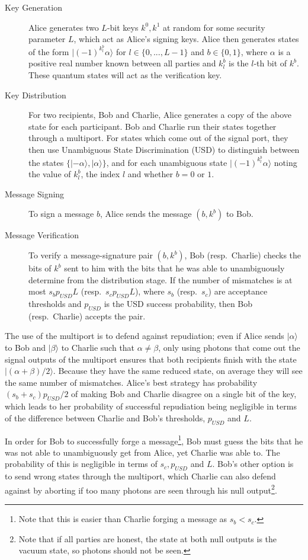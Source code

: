 \documentclass[%
 reprint,
 amsmath,amssymb,
 aps,
 pra,
]{revtex4-1}
\begin{document}
\begin{description}
\item[Key Generation]Alice generates two $L$-bit keys $k^0, k^1$ at random for some security parameter $L$, which act as Alice's signing keys. Alice then generates states of the form $|(-1)^{k^b_l}\alpha\rangle$ for $l \in \{0,...,L-1\}$ and $b \in \{0, 1\}$, where $\alpha$ is a positive real number known between all parties and $k^b_l$ is the $l$-th bit of $k^b$. These quantum states will act as the verification key.
\item[Key Distribution]For two recipients, Bob and Charlie, Alice generates a copy of the above state for each participant. Bob and Charlie run their states together through a multiport. For states which come out of the signal port, they then use Unambiguous State Discrimination (USD) \cite{Ivanovic1987257} to distinguish between the states $\{|-\alpha\rangle, |\alpha\rangle\}$, and for each unambiguous state $|(-1)^{k^b_l}\alpha\rangle$ noting the value of $k^b_l$, the index $l$ and whether $b = 0$ or $1$.
\item[Message Signing]To sign a message $b$, Alice sends the message $(b, k^b)$ to Bob.
\item[Message Verification]To verify a message-signature pair $(b, k^b)$, Bob (resp.\ Charlie) checks the bits of $k^b$ sent to him with the bits that he was able to unambiguously determine from the distribution stage. If the number of mismatches is at most $s_bp_{USD}L$ (resp.\ $s_cp_{USD}L$), where $s_b$ (resp.\ $s_c$) are acceptance thresholds and $p_{USD}$ is the USD success probability, then Bob (resp.\ Charlie) accepts the pair.
\end{description}

The use of the multiport is to defend against repudiation; even if Alice sends $|\alpha\rangle$ to Bob and $|\beta\rangle$ to Charlie such that $\alpha \neq \beta$, only using photons that come out the signal outputs of the multiport ensures that both recipients finish with the state $|(\alpha + \beta)/2\rangle$. Because they have the same reduced state, on average they will see the same number of mismatches. Alice's best strategy has probability $(s_b + s_c)p_{USD}/2$ of making Bob and Charlie disagree on a single bit of the key, which leads to her probability of successful repudiation being negligible in terms of the difference between Charlie and Bob's thresholds, $p_{USD}$ and $L$.

In order for Bob to successfully forge a message\footnote{Note that this is easier than Charlie forging a message as $s_b < s_c$.}, Bob must guess the bits that he was not able to unambiguously get from Alice, yet Charlie was able to. The probability of this is negligible in terms of $s_c, p_{USD}$ and $L$. Bob's other option is to send wrong states through the multiport, which Charlie can also defend against by aborting if too many photons are seen through his null output\footnote{Note that if all parties are honest, the state at both null outputs is the vacuum state, so photons should not be seen.}.
\end{document}
